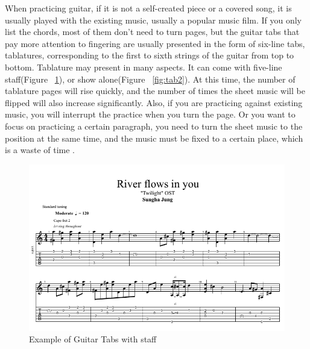 \documentclass[10pt,twocolumn,letterpaper]{article}
\begin{document}
\begin{CJK}{UTF8}{bsmi}
When practicing guitar, if it is not a self-created piece or a covered song, it is usually played with the existing music, usually a popular music film.
If you only list the chords, most of them don’t need to turn pages, but the guitar tabs that pay more attention to fingering are usually presented in the form of six-line tabs, tablatures, corresponding to the first to sixth strings of the guitar from top to bottom. 
Tablature may present in many aspects. 
It can come with five-line staff(Figure ~\ref{fig:tab1}), or show alone(Figure ~\ref{fig:tab2}). 
At this time, the number of tablature pages will rise quickly, and the number of times the sheet music will be flipped will also increase significantly. 
Also, if you are practicing against existing music, you will interrupt the practice when you turn the page. 
Or you want to focus on practicing a certain paragraph, you need to turn the sheet music to the position at the same time, and the music must be fixed to a certain place, which is a waste of time .

\begin{figure}[t]
\begin{center}
   \includegraphics[width=0.9\linewidth]{tablature.png}
\end{center}
\caption{Example of Guitar Tabs with staff\cite{river_flows_in_you}}
\label{fig:long}
\label{fig:tab1}
\end{figure}


\end{CJK}
\end{document}
